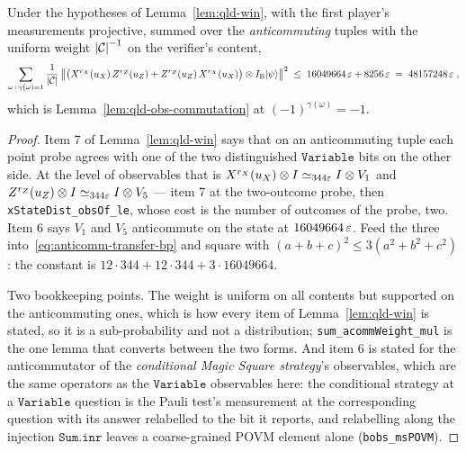 \effortMedium

\begin{lemma}
\label{lem:qld-obs-commutation-acomm}
\leanok
Under the hypotheses of Lemma~\ref{lem:qld-win}, with the first player's measurements projective,
summed over the \emph{anticommuting} tuples with the uniform weight $\left\vert {\ensuremath{\mathcal{C}}} \right\vert^{-1}$ on the
verifier's content,
\begin{equation*}
  \sum_{\omega \,:\, \gamma(\omega) = 1} \frac{1}{\left\vert {\ensuremath{\mathcal{C}}} \right\vert}
    \left\| {\bigl( X^{r_X}(u_X)\, Z^{r_Z}(u_Z) + Z^{r_Z}(u_Z)\, X^{r_X}(u_X) \bigr) \otimes I_{\textsc{B}}
      |\psi\rangle} \right\|^2
  \;\leq\; 16049664\, \varepsilon + 8256\, \varepsilon \;=\; 48157248\, \varepsilon\;,
\end{equation*}
which is Lemma~\ref{lem:qld-obs-commutation} at $(-1)^{\gamma(\omega)} = -1$.
\end{lemma}

\begin{proof}
\leanok
{}
Item 7 of Lemma~\ref{lem:qld-win} says that on an anticommuting tuple each point probe agrees
with one of the two distinguished $\mathtt{Variable}$ bits on the other side. At the level of
observables that is $X^{r_X}(u_X) \otimes I \simeq_{344\varepsilon} I \otimes V_1$ and
$Z^{r_Z}(u_Z) \otimes I \simeq_{344\varepsilon} I \otimes V_5$ --- item 7 at the two-outcome probe, then
\texttt{xStateDist\_obsOf\_le}, whose cost is the number of outcomes of the probe, two. Item 6
says $V_1$ and $V_5$ anticommute on the state at $16049664\,\varepsilon$. Feed the three
into~\eqref{eq:anticomm-transfer-bp} and square with
$(a+b+c)^2 \leq 3(a^2+b^2+c^2)$: the constant is
$12 \cdot 344 + 12 \cdot 344 + 3 \cdot 16049664$.

Two bookkeeping points. The weight is uniform on all contents but supported on the anticommuting
ones, which is how every item of Lemma~\ref{lem:qld-win} is stated, so it is a sub-probability and
not a distribution; \texttt{sum\_acommWeight\_mul} is the one lemma that converts between the two
forms. And item 6 is stated for the anticommutator of the \emph{conditional Magic Square
strategy}'s observables, which are the same operators as the $\mathtt{Variable}$ observables here:
the conditional strategy at a $\mathtt{Variable}$ question is the Pauli test's measurement at the
corresponding question with its answer relabelled to the bit it reports, and relabelling along the
injection $\mathtt{Sum.inr}$ leaves a coarse-grained POVM element alone
(\texttt{bobs\_msPOVM}).
\end{proof}

